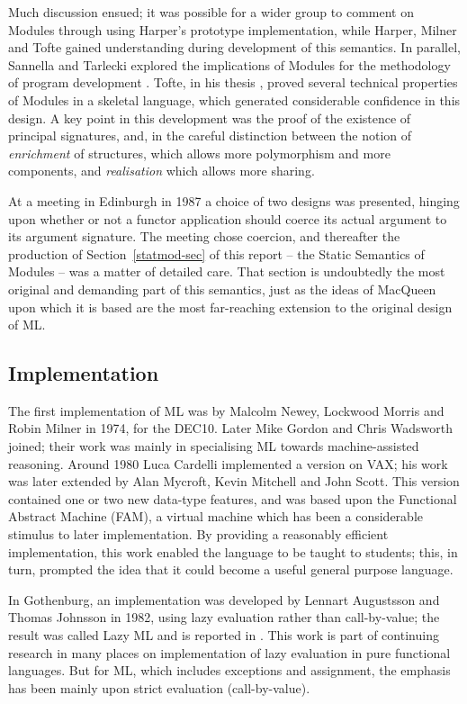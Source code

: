 Much discussion ensued;  it was possible for a wider group to comment on
Modules through using Harper's prototype implementation, while
Harper, Milner and Tofte gained understanding during development of this
semantics.  In parallel, Sannella and Tarlecki explored the implications
of Modules for the methodology of program development \cite{ST}.  Tofte, in his 
thesis \cite{Tof}, proved several technical
properties of Modules in a skeletal language, which generated considerable
confidence in this design. A key point in this development was the proof
of the existence of principal signatures, and, in the careful distinction
between the notion of {\it enrichment} of structures, which allows more
polymorphism and more components, and {\it realisation} which allows more
sharing.

At a meeting in Edinburgh in 1987 a choice of two designs was presented,
hinging upon whether or not a functor application should coerce its
actual argument to its argument signature.  The meeting chose coercion,
and thereafter the production of Section~\ref{statmod-sec} of this report -- the
Static Semantics of Modules -- was a matter of detailed care.  That
section is undoubtedly the most original and demanding part of this
semantics, just as the ideas of MacQueen upon which it is based are the
most far-reaching extension to the original design of ML.

\subsection*{Implementation}

The first implementation of ML was by Malcolm Newey, Lockwood Morris
and Robin Milner in 1974, for the DEC10.  Later Mike Gordon and Chris
Wadsworth joined;  their work was mainly in specialising ML towards
machine-assisted reasoning.  Around 1980 Luca Cardelli implemented
a version on VAX;  his work was later extended by Alan Mycroft, Kevin
Mitchell and John Scott.  This version contained one or two new data-type 
features, and was based upon the Functional Abstract Machine (FAM), a virtual
machine which has been a considerable stimulus to later implementation.
By providing a reasonably efficient implementation, this work enabled the 
language to be taught to students; this, in turn, prompted
the idea that it could become a useful general purpose language.

In Gothenburg, an implementation was developed by Lennart Augustsson and 
Thomas Johnsson in 1982, using lazy 
evaluation rather than call-by-value; the result was called Lazy ML
and is reported in \cite{Aug}.  This work is part of continuing research
in many places on implementation of lazy evaluation in pure functional 
languages.  But for ML, which includes exceptions and assignment, the 
emphasis has been mainly upon strict evaluation (call-by-value).

